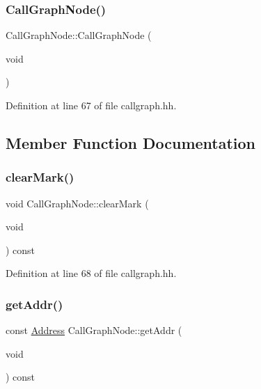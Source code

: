 \subsubsection{\texorpdfstring{CallGraphNode()}{CallGraphNode()}}
{\footnotesize\ttfamily Call\+Graph\+Node\+::\+Call\+Graph\+Node (\begin{DoxyParamCaption}\item[{void}]{ }\end{DoxyParamCaption})\hspace{0.3cm}{\ttfamily [inline]}}



Definition at line 67 of file callgraph.\+hh.



\subsection{Member Function Documentation}
\mbox{\label{class_call_graph_node_aa61644a0a00f64254a00c04dec29a054}} 
\subsubsection{\texorpdfstring{clearMark()}{clearMark()}}
{\footnotesize\ttfamily void Call\+Graph\+Node\+::clear\+Mark (\begin{DoxyParamCaption}\item[{void}]{ }\end{DoxyParamCaption}) const\hspace{0.3cm}{\ttfamily [inline]}}



Definition at line 68 of file callgraph.\+hh.

\mbox{\label{class_call_graph_node_a8b884b92324abe22eb8c2442c027b660}} 
\subsubsection{\texorpdfstring{getAddr()}{getAddr()}}
{\footnotesize\ttfamily const \mbox{\hyperlink{class_address}{Address}} Call\+Graph\+Node\+::get\+Addr (\begin{DoxyParamCaption}\item[{void}]{ }\end{DoxyParamCaption}) const\hspace{0.3cm}{\ttfamily [inline]}}



